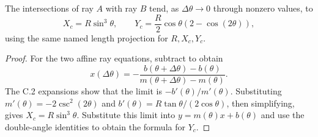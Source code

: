 \begin{theorem}
\label{thm:physics:IPhO_2026_2_C_3:target}
The intersections of ray \(A\) with ray \(B\) tend, as
\(\Delta\theta\to0\) through nonzero values, to
\[
X_c=R\sin^3\theta,\qquad
Y_c=\frac R2\cos\theta\left(2-\cos(2\theta)\right),
\]
using the same named length projection for \(R,X_c,Y_c\).
\end{theorem}
\begin{proof}
For the two affine ray equations, subtract to obtain
\[
x(\Delta\theta)=-
\frac{b(\theta+\Delta\theta)-b(\theta)}
     {m(\theta+\Delta\theta)-m(\theta)}.
\]
The C.2 expansions show that the limit is \(-b'(\theta)/m'(\theta)\).
Substituting \(m'(\theta)=-2\csc^2(2\theta)\) and
\(b'(\theta)=R\tan\theta/(2\cos\theta)\), then simplifying, gives
\(X_c=R\sin^3\theta\).  Substitute this limit into
\(y=m(\theta)x+b(\theta)\) and use the double-angle identities to obtain the
formula for \(Y_c\).
\end{proof}
